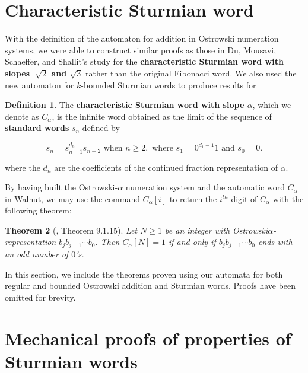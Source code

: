 \documentclass[a4paper]{article}
\theoremstyle{definition}
\newtheorem{definition}{Definition}[section]
\theoremstyle{remark}
\theoremstyle{remark}
\theoremstyle{plain}
\newtheorem{theorem}[definition]{Theorem}
\begin{document}
\section{Characteristic Sturmian word}

With the definition of the automaton for addition in Ostrowski numeration systems, we were able to construct similar proofs as those in Du, Mousavi, Schaeffer, and Shallit's study \cite{fibonacci} for the \textbf{characteristic Sturmian word with slopes $\sqrt[~]{2}$ and $\sqrt{3}$} rather than the original Fibonacci word.
We also used the new automaton for $k$-bounded Sturmian words to produce results for 

\begin{definition}
The \textbf{characteristic Sturmian word with slope $\alpha$}, which we denote as $C_{\alpha}$, is the infinite word obtained as the limit of the sequence of \textbf{standard words} $s_n$ defined by{

$$ s_n=s^{d_n}_{n-1}s_{n-2} \text{ when } n\ge 2, \text{ where } s_1= 0^{d_1-1}1 \text{ and } s_0=0.$$}

where the $d_n$ are the coefficients of the continued fraction representation of $\alpha$.
\end{definition}

By having built the Ostrowski-$\alpha$ numeration system and the automatic word $C_{\alpha}$ in Walnut, we may use the command $C_{\alpha}[i]$ to return the $i^{th}$ digit of $C_{\alpha}$ with the following theorem:\\

\begin{theorem}[\cite{auto_seq}, Theorem 9.1.15] Let $N \geq 1$ be an integer with Ostrowski$\alpha$-representation $b_jb_{j−1}\cdots b_0$. Then $C_\alpha[N] = 1$ if and only if $b_jb_{j−1}\cdots b_0$ ends with an odd number of $0$’s.
\end{theorem}


In this section, we include the theorems proven using our automata for both regular and bounded Ostrowski addition and Sturmian words.
Proofs have been omitted for brevity.

\section{Mechanical proofs of properties of Sturmian words}\label{sec:specific-theorems}
\end{document}

